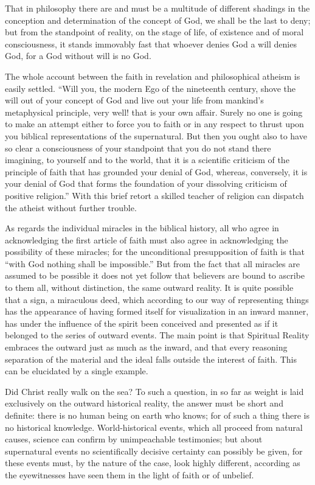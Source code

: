 \documentclass[12pt,a4paper,openany]{book}
\newcommand{\opage}[1]{\marginnote{\footnotesize\textit{[#1]}}}
\begin{document}
That in philosophy there are and must be a multitude of
different shadings in the conception and determination
of the concept of God, we shall be the last to deny;
but from the standpoint of reality, on the stage of life, of existence
and of moral consciousness, it stands immovably
fast that whoever denies God a will denies
God, for a God without will is no God.

The whole account between the faith in revelation
and philosophical atheism is easily settled.
``Will you, the modern Ego of the nineteenth century, shove the will
out of your concept of God and live out your life from
\setcounter{footnote}{0}%
\opage{309}mankind's metaphysical principle, very well! that is your own
affair. Surely no one is going to make an attempt
either to force you to faith or in any respect
to thrust upon you biblical representations of the supernatural.
But then you ought also to have so clear a consciousness
of your standpoint that you do not stand there
imagining, to yourself and to the world, that it is a scientific
criticism of the principle of faith that has grounded your
denial of God, whereas, conversely, it is your denial of God
that forms the foundation of your dissolving criticism
of positive religion.'' With this brief retort a
skilled teacher of religion can dispatch the atheist without further trouble.

As regards the individual miracles in the biblical history,
all who agree in acknowledging the
first article of faith must also agree in acknowledging
the possibility of these miracles; for the unconditional presupposition of faith
is that ``with God nothing shall be impossible.''
But from the fact that all miracles are assumed to be possible it
does not yet follow that believers are bound
to ascribe to them all, without distinction, the same outward
reality. It is quite possible that a sign, a
miraculous deed, which according to our way of representing things has the appearance
of having formed itself for visualization in an inward
manner, has under the influence of the spirit been
conceived and presented as if it belonged to the series of
outward events. The main point is that Spiritual Reality
embraces the outward just as much as the
inward, and that every reasoning separation of the
material and the ideal falls outside the interest of faith.
This can be elucidated by a single example.

\setcounter{footnote}{0}%
\opage{310}Did Christ really walk on the sea? To such a
question, in so far as weight is laid exclusively on
the outward historical reality, the answer must be short and definite:
there is no human being on
earth who knows; for of such a thing there is no historical
knowledge. World-historical events, which all
proceed from natural causes, science can confirm
by unimpeachable testimonies; but about supernatural
events no scientifically decisive
certainty can possibly be given, for these events
must, by the nature of the case, look highly different,
according as the eyewitnesses have seen them in the light of faith or of
unbelief.
\end{document}
